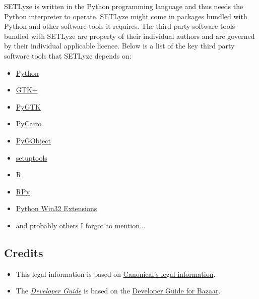 \documentclass[letterpaper,10pt,english]{sphinxmanual}
\begin{document}
SETLyze is written in the Python programming language and thus needs the
Python interpreter to operate. SETLyze might come in packages bundled
with Python and other software tools it requires. The third party
software tools bundled with SETLyze are property of their individual
authors and are governed by their individual applicable licence. Below
is a list of the key third party software tools that SETLyze depends on:
\begin{itemize}
\item {} 
\href{http://www.python.org/about/legal/}{Python}

\item {} 
\href{http://www.gtk.org/index.php}{GTK+}

\item {} 
\href{http://www.pygtk.org/about.html}{PyGTK}

\item {} 
\href{http://cairographics.org/pycairo/}{PyCairo}

\item {} 
\href{http://www.pygtk.org/downloads.html}{PyGObject}

\item {} 
\href{http://pypi.python.org/pypi/setuptools}{setuptools}

\item {} 
\href{http://www.r-project.org/about.html}{R}

\item {} 
\href{http://rpy.sourceforge.net/index.html}{RPy}

\item {} 
\href{http://starship.python.net/crew/mhammond/win32/Downloads.html}{Python Win32 Extensions}

\item {} 
and probably others I forgot to mention...

\end{itemize}


\subsection{Credits}
\label{legal:credits}\begin{itemize}
\item {} 
This legal information is based on \href{http://www.canonical.com/legal}{Canonical's legal information}.

\item {} 
The {\hyperref[developer_guide:developer-guide]{\emph{Developer Guide}}} is based on the \href{http://doc.bazaar.canonical.com/bzr.2.1/developers/HACKING.html}{Developer Guide for Bazaar}.

\end{itemize}
\end{document}
